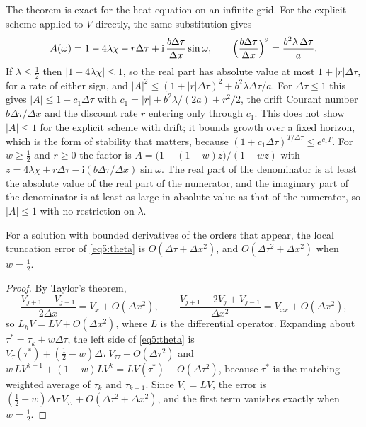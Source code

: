 \begin{chapterrefs}
The theorem is exact for the heat equation on an infinite grid. For the explicit scheme applied to
$V$ directly, the same substitution gives
\begin{equation*}
  A(\omega)=1-4\lambda\chi-r\Delta\tau+\mathrm i\,\frac{b\Delta\tau}{\Delta x}\sin\omega ,\qquad
  \Bigl(\frac{b\Delta\tau}{\Delta x}\Bigr)^2=\frac{b^2\lambda\,\Delta\tau}{a}.
\end{equation*}
If $\lambda\le\tfrac12$ then $|1-4\lambda\chi|\le1$, so the real part has absolute value at most
$1+|r|\Delta\tau$, for a rate of either sign, and $|A|^2\le(1+|r|\Delta\tau)^2+b^2\lambda\Delta\tau/a$. For
$\Delta\tau\le1$ this gives $|A|\le1+c_1\Delta\tau$ with $c_1=|r|+b^2\lambda/(2a)+r^2/2$, the drift Courant
number $b\Delta\tau/\Delta x$ and the discount rate $r$ entering only through $c_1$. This does not show
$|A|\le1$ for the explicit scheme with drift; it bounds growth over a fixed horizon, which is the form
of stability that matters, because $(1+c_1\Delta\tau)^{T/\Delta\tau}\le e^{c_1T}$. For $w\ge\tfrac12$ and $r\ge0$ the factor is
$A=\bigl(1-(1-w)z\bigr)/(1+wz)$ with $z=4\lambda\chi+r\Delta\tau-\mathrm i(b\Delta\tau/\Delta x)\sin\omega$.
The real part of the denominator is at least the absolute value of the real part of the numerator, and the
imaginary part of the denominator is at least as large in absolute value as that of the numerator, so
$|A|\le1$ with no restriction on $\lambda$.

\begin{proposition}[Consistency]\label{prop5:consistency}
For a solution with bounded derivatives of the orders that appear, the local truncation error of
\cref{eq5:theta} is $O(\Delta\tau+\Delta x^2)$, and $O(\Delta\tau^2+\Delta x^2)$ when $w=\tfrac12$.
\end{proposition}

\begin{proof}
By Taylor's theorem,
\begin{equation*}
  \frac{V_{j+1}-V_{j-1}}{2\Delta x}=V_x+O(\Delta x^2),\qquad
  \frac{V_{j+1}-2V_j+V_{j-1}}{\Delta x^2}=V_{xx}+O(\Delta x^2),
\end{equation*}
so $L_hV=LV+O(\Delta x^2)$, where $L$ is the
differential operator. Expanding about $\tau^*=\tau_k+w\Delta\tau$, the left side of
\cref{eq5:theta} is $V_\tau(\tau^*)+(\tfrac12-w)\Delta\tau\,V_{\tau\tau}+O(\Delta\tau^2)$ and
$w\,LV^{k+1}+(1-w)LV^k=LV(\tau^*)+O(\Delta\tau^2)$, because $\tau^*$ is the matching weighted
average of $\tau_k$ and $\tau_{k+1}$. Since $V_\tau=LV$, the error is
$(\tfrac12-w)\Delta\tau\,V_{\tau\tau}+O(\Delta\tau^2+\Delta x^2)$, and the first term vanishes
exactly when $w=\tfrac12$.
\end{proof}


\end{chapterrefs}
